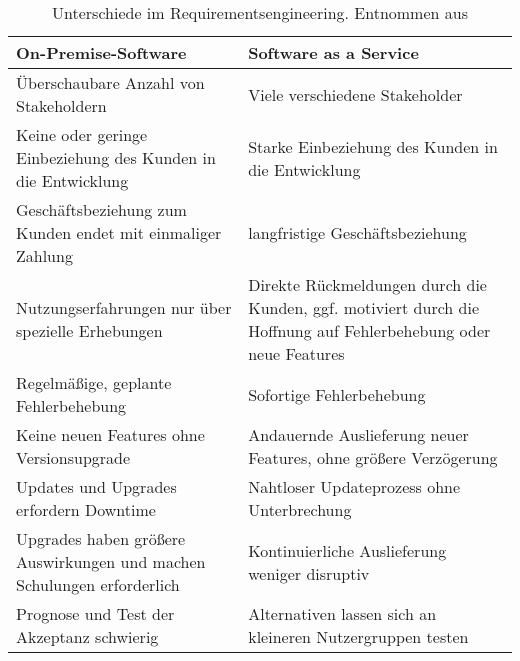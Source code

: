 \begin{table}[ht!]
\centering
\begin{longtable}{|p{}|p{}|}
\hline
\textbf{On-Premise-Software} & \textbf{Software as a Service} \\
\hline %
Überschaubare Anzahl von Stakeholdern & Viele verschiedene Stakeholder \\
\hline
Keine oder geringe Einbeziehung des Kunden in die Entwicklung & Starke 
Einbeziehung des Kunden in die Entwicklung\\ \hline
Geschäftsbeziehung zum Kunden endet mit einmaliger Zahlung & langfristige 
Geschäftsbeziehung \\ \hline
Nutzungserfahrungen nur über spezielle Erhebungen & Direkte Rückmeldungen durch die Kunden, ggf.
motiviert durch die Hoffnung auf Fehlerbehebung oder neue Features \\ \hline
Regelmäßige, geplante Fehlerbehebung & Sofortige Fehlerbehebung \\ \hline
Keine neuen Features ohne Versionsupgrade & Andauernde Auslieferung neuer 
Features, ohne größere Verzögerung \\ \hline
Updates und Upgrades erfordern Downtime & Nahtloser Updateprozess ohne 
Unterbrechung \\ \hline
Upgrades haben größere Auswirkungen und machen Schulungen erforderlich & 
Kontinuierliche Auslieferung weniger disruptiv \\ \hline
Prognose und Test der Akzeptanz schwierig & Alternativen lassen sich an 
kleineren Nutzergruppen testen \\
\hline %
\end{longtable}
\caption{Unterschiede im Requirementsengineering. Entnommen aus 
\cite{changes_in_requirements_engineering}}
\label{tab:unterschiede_im_re}
\end{table}